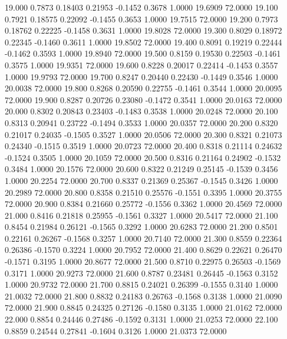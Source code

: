   19.000   0.7873   0.18403   0.21953  -0.1452   0.3678   1.0000  19.6909  72.0000
  19.100   0.7921   0.18575   0.22092  -0.1455   0.3653   1.0000  19.7515  72.0000
  19.200   0.7973   0.18762   0.22225  -0.1458   0.3631   1.0000  19.8028  72.0000
  19.300   0.8029   0.18972   0.22345  -0.1460   0.3611   1.0000  19.8502  72.0000
  19.400   0.8091   0.19219   0.22444  -0.1462   0.3593   1.0000  19.8940  72.0000
  19.500   0.8159   0.19530   0.22503  -0.1461   0.3575   1.0000  19.9351  72.0000
  19.600   0.8228   0.20017   0.22414  -0.1453   0.3557   1.0000  19.9793  72.0000
  19.700   0.8247   0.20440   0.22430  -0.1449   0.3546   1.0000  20.0038  72.0000
  19.800   0.8268   0.20590   0.22755  -0.1461   0.3544   1.0000  20.0095  72.0000
  19.900   0.8287   0.20726   0.23080  -0.1472   0.3541   1.0000  20.0163  72.0000
  20.000   0.8302   0.20843   0.23403  -0.1483   0.3538   1.0000  20.0248  72.0000
  20.100   0.8313   0.20941   0.23722  -0.1494   0.3533   1.0000  20.0357  72.0000
  20.200   0.8320   0.21017   0.24035  -0.1505   0.3527   1.0000  20.0506  72.0000
  20.300   0.8321   0.21073   0.24340  -0.1515   0.3519   1.0000  20.0723  72.0000
  20.400   0.8318   0.21114   0.24632  -0.1524   0.3505   1.0000  20.1059  72.0000
  20.500   0.8316   0.21164   0.24902  -0.1532   0.3484   1.0000  20.1576  72.0000
  20.600   0.8322   0.21249   0.25145  -0.1539   0.3456   1.0000  20.2254  72.0000
  20.700   0.8337   0.21369   0.25367  -0.1545   0.3426   1.0000  20.2989  72.0000
  20.800   0.8358   0.21510   0.25576  -0.1551   0.3395   1.0000  20.3755  72.0000
  20.900   0.8384   0.21660   0.25772  -0.1556   0.3362   1.0000  20.4569  72.0000
  21.000   0.8416   0.21818   0.25955  -0.1561   0.3327   1.0000  20.5417  72.0000
  21.100   0.8454   0.21984   0.26121  -0.1565   0.3292   1.0000  20.6283  72.0000
  21.200   0.8501   0.22161   0.26267  -0.1568   0.3257   1.0000  20.7140  72.0000
  21.300   0.8559   0.22364   0.26386  -0.1570   0.3224   1.0000  20.7952  72.0000
  21.400   0.8629   0.22621   0.26470  -0.1571   0.3195   1.0000  20.8677  72.0000
  21.500   0.8710   0.22975   0.26503  -0.1569   0.3171   1.0000  20.9273  72.0000
  21.600   0.8787   0.23481   0.26445  -0.1563   0.3152   1.0000  20.9732  72.0000
  21.700   0.8815   0.24021   0.26399  -0.1555   0.3140   1.0000  21.0032  72.0000
  21.800   0.8832   0.24183   0.26763  -0.1568   0.3138   1.0000  21.0090  72.0000
  21.900   0.8845   0.24325   0.27126  -0.1580   0.3135   1.0000  21.0162  72.0000
  22.000   0.8854   0.24446   0.27486  -0.1592   0.3131   1.0000  21.0253  72.0000
  22.100   0.8859   0.24544   0.27841  -0.1604   0.3126   1.0000  21.0373  72.0000
